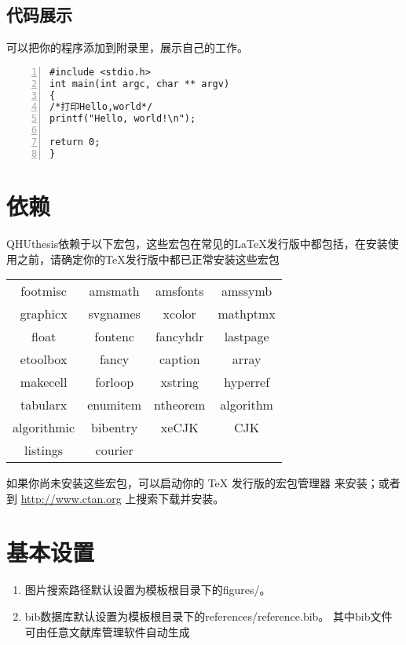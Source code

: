 \subsection{代码展示}
可以把你的程序添加到附录里，展示自己的工作。
\begin{lstlisting}[language={[ANSI]C}, numbers=left]
#include <stdio.h>
int main(int argc, char ** argv)
{
/*打印Hello,world*/
printf("Hello, world!\n");

return 0;
}
\end{lstlisting}
\section{依赖}
QHUthesis依赖于以下宏包，这些宏包在常见的\LaTeX{}发行版中都包括，在安装使用之前，请确定你的\TeX{}发行版中都已正常安装这些宏包
\begin{table}[H]
	\centering
	\begin{tabular}{cccc}
		\hline
		{footmisc} &  {amsmath} &  {amsfonts} &  {amssymb} \\
		
		{graphicx} &  {svgnames} &  {xcolor} &  {mathptmx} \\
		
		{float} &  {fontenc} &  {fancyhdr} &  {lastpage} \\
		
		{etoolbox} &  {fancy} &  {caption} &  {array} \\
		
		{makecell} &  {forloop} &  {xstring} &  {hyperref} \\
		
		{tabularx} &  {enumitem} &  {ntheorem} &  {algorithm}\\
		
		{algorithmic} &  {bibentry} &  {xeCJK} &  {CJK} \\
		{listings} &  {courier} &  {} &  {} \\
		\hline
	\end{tabular}
\end{table}
如果你尚未安装这些宏包，可以启动你的 \TeX{} 发行版的宏包管理器
来安装；或者到 \url{http://www.ctan.org} 上搜索下载并安装。
\section{基本设置}
\begin{enumerate}
	\item 图片搜索路径默认设置为模板根目录下的figures/。
	\item bib数据库默认设置为模板根目录下的references/reference.bib。 其中bib文件可由任意文献库管理软件自动生成
\end{enumerate}




